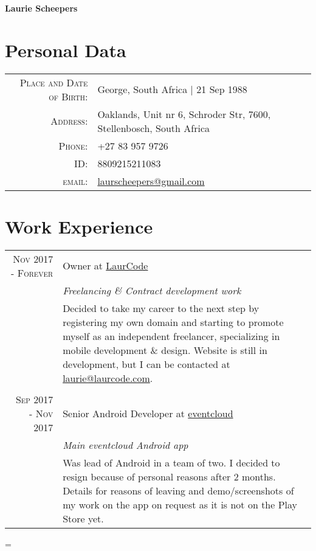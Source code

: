 \documentclass[a4paper,10pt,notitlepage]{article}
\newenvironment{absolutelynopagebreak}
  {\par\nobreak\vfil\penalty0\vfilneg
   \vtop\bgroup}
  {\par\xdef\tpd{\the\prevdepth}\egroup
   \prevdepth=\tpd}
\begin{document}
\begin{absolutelynopagebreak}

\begin{center}
   \begin{center}
      \Huge\textbf{Laurie Scheepers}
   \end{center}
\end{center}
	
\section{Personal Data}

\begin{tabular}{rl}
    \textsc{Place and Date of Birth:} & George, South Africa  | 21 Sep 1988 \\
    \textsc{Address:}   & Oaklands, Unit nr 6, Schroder Str, 7600, Stellenbosch, South Africa \\
    \textsc{Phone:}     & +27 83 957 9726\\
    \textsc{ID:}     & 8809215211083 \\
    \textsc{email:}     & \href{mailto:laurscheepers@gmail.com}{laurscheepers@gmail.com}
\end{tabular}


\section{Work Experience}
\begin{tabular}{r|p{11cm}}

\textsc{Nov 2017 - Forever} & Owner at \href{www.laurcode.com}{LaurCode} \\&\emph{Freelancing \& Contract development work}\\&\footnotesize{Decided to take my career to the next step by registering my own domain and starting to promote myself as an independent freelancer, specializing in mobile development \& design. Website is still in development, but I can be contacted at \href{mailto:laurie@laurcode.com}{laurie@laurcode.com}.} \\
\multicolumn{2}{c}{} \\

\textsc{Sep 2017 - Nov 2017} & Senior Android Developer at \href{www.eventcloud.co}{eventcloud} \\&\emph{Main eventcloud Android app}\\&\footnotesize{Was lead of Android in a team of two. I decided to resign because of personal reasons after 2 months. Details for reasons of leaving and demo/screenshots of my work on the app on request as it is not on the Play Store yet.} \\


\end{tabular}
\end{absolutelynopagebreak}
\end{document}
